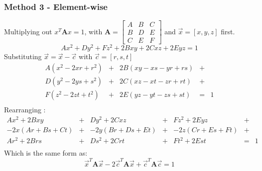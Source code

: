 \documentclass{article}
\def\mat#1{\mathbf{#1}}
\begin{document}
\subsubsection{Method 3 - Element-wise}
Multiplying out $x^T\mat{A}x = 1$, with 
$\mat{A} = \left[ \begin{smallmatrix}
A & B & C \\
B & D & E \\
C & E & F
\end{smallmatrix} \right]$ and $\vec{x}=\left[ x,y,z \right]$ first.
\begin{equation}
Ax^2 + Dy^2 + Fz^2 + 2Bxy + 2Cxz +2Eyz = 1
\end{equation} 
Substituting $\vec{x} = \vec{x}-\vec{c}$ with $\vec{c} = \left[r,s,t\right]$
\begin{equation}
\begin{matrix}
A(x^2 - 2xr + r^2) &+& 2B(xy -xs -yr + rs) &+&\\
D(y^2 - 2ys + s^2) &+& 2C(xz -xt -zr + rt) &+&\\
F(z^2 - 2zt + t^2) &+& 2E(yz -yt -zs + st) &=&1\\
\end{matrix}
\end{equation}
Rearranging :
\begin{equation}
\begin{matrix}
Ax^2 + 2Bxy &+& Dy^2 + 2Cxz &+& Fz^2 + 2Eyz &+& \\
-2x(Ar+Bs+Ct) &+& -2y(Br+Ds+Et) &+& -2z(Cr+Es+Ft) &+&\\
Ar^2+2Brs  &+& Ds^2 + 2Crt &+& Ft^2 + 2Est &=&1  \\
\end{matrix}
\end{equation}
Which is the same form as:
\begin{equation}
\vec{x}^T \mat{A}\vec{x} - 2\vec{c}^T\mat{A}\vec{x} + \vec{c}^T\mat{A}\vec{c} = 1
\end{equation}
\end{document}
